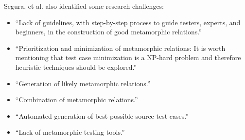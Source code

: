 Segura, et al. \cite{Segura2016} also identified some research challenges:
\begin{itemize}
	\item \enquote{Lack of guidelines, with step-by-step process to guide testers, experts, and beginners, in the construction of good metamorphic relations.}
	\item \enquote{Prioritization and minimization of metamorphic relations: It is worth mentioning that test case minimization is a NP-hard problem and therefore heuristic techniques should be explored.}
	\item \enquote{Generation of likely metamorphic relations.}
	\item \enquote{Combination of metamorphic relations.}
	\item \enquote{Automated generation of best possible source test cases.}
	\item \enquote{Lack of metamorphic testing tools.}
\end{itemize}
